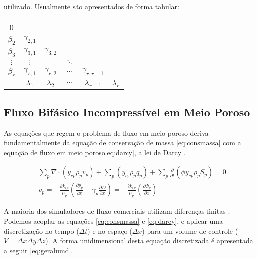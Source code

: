 \documentclass[final,5p]{elsarticle}
\numberwithin{equation}{section}
\begin{document}
    utilizado. Usualmente são apresentados de forma tabular:

    \bigskip
    \renewcommand{\arraystretch}{1.2}
    \begin{tabular}{c|ccccc}
        0         &                &                &          &                  &    \\
        $\beta_2$ & $\gamma_{2,1}$ &                &          &                  &    \\
        $\beta_3$ & $\gamma_{3,1}$ & $\gamma_{3,2}$ &          &                  &    \\
        $\vdots$  & $\vdots$       &                & $\ddots$ &                  &    \\
        $\beta_r$ & $\gamma_{r,1}$ & $\gamma_{r,2}$ & $\cdots$ & $\gamma_{r,r-1}$ &    \\
        \hline
        & $\lambda_1$    & $\lambda_2$    & $\cdots$ & $\lambda_{r-1}$  & $\lambda_r$ \\
    \end{tabular}
    \bigskip

    \subsection{Fluxo Bifásico Incompressível em Meio Poroso}

        As equações que regem o problema de fluxo em meio poroso deriva fundamentalmente da equação de conservação de massa \ref{eq:consmassa} com a equação de fluxo em meio poroso\ref{eq:darcy}, a lei de Darcy \cite{dake1983fundamentals}.

        \begin{align}
            &\sum_{p} \nabla \cdot  (y_{cp} \rho_p v_p) + \sum_{p} (y_{cp} \rho_p q_p) + \sum_{p} \frac{\partial}{\partial t} \left( \phi y_{cp} \rho_p S_p\right) = 0 \label{eq:consmassa} \\
            &v_p = - \frac{k k_{rp}}{\mu_p} \left( \frac{\partial p_p}{\partial x} - \gamma_p \frac{\partial D}{\partial x} \right) = - \frac{k k_{rp}}{\mu_p} \left( \frac{\partial \Phi_p}{\partial x} \right)\label{eq:darcy}
        \end{align}

        A maioria dos simuladores de fluxo comerciais utilizam diferenças finitas \cite{computer2022cmg}\cite{schlumberger2009technical}. Podemos acoplar as equações \ref{eq:consmassa} e \ref{eq:darcy}, e aplicar uma discretização no tempo ($\Delta t$) e no espaço ($\Delta x$) para um volume de controle ($V = \Delta x \Delta y \Delta z$). A forma unidimensional desta equação discretizada é apresentada a seguir \ref{eq:geralumd}.
\end{document}
